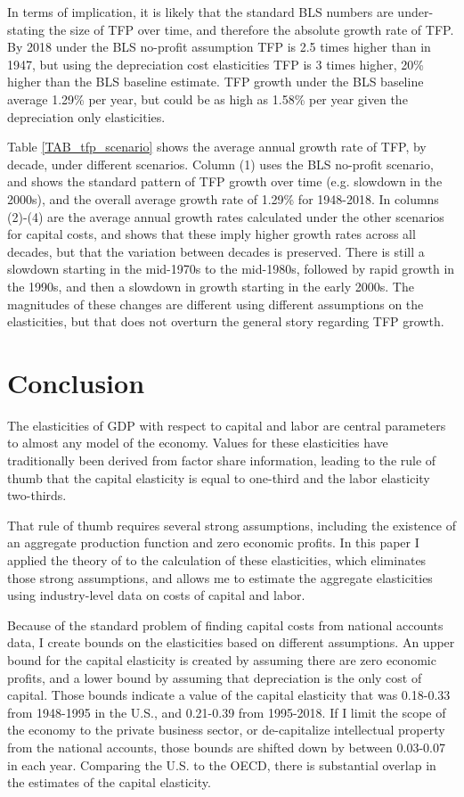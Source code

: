 \documentclass[11pt]{article}
\begin{document}
In terms of implication, it is likely that the standard BLS numbers are under-stating the size of TFP over time, and therefore the absolute growth rate of TFP. By 2018 under the BLS no-profit assumption TFP is 2.5 times higher than in 1947, but using the depreciation cost elasticities TFP is 3 times higher, 20\% higher than the BLS baseline estimate. TFP growth under the BLS baseline average 1.29\% per year, but could be as high as 1.58\% per year given the depreciation only elasticities.

Table \ref{TAB_tfp_scenario} shows the average annual growth rate of TFP, by decade, under different scenarios. Column (1) uses the BLS no-profit scenario, and shows the standard pattern of TFP growth over time (e.g. slowdown in the 2000s), and the overall average growth rate of 1.29\% for 1948-2018. In columns (2)-(4) are the average annual growth rates calculated under the other scenarios for capital costs, and shows that these imply higher growth rates across all decades, but that the variation between decades is preserved. There is still a slowdown starting in the mid-1970s to the mid-1980s, followed by rapid growth in the 1990s, and then a slowdown in growth starting in the early 2000s. The magnitudes of these changes are different using different assumptions on the elasticities, but that does not overturn the general story regarding TFP growth.

\section{Conclusion}
The elasticities of GDP with respect to capital and labor are central parameters to almost any model of the economy. Values for these elasticities have traditionally been derived from factor share information, leading to the rule of thumb that the capital elasticity is equal to one-third and the labor elasticity two-thirds. 

That rule of thumb requires several strong assumptions, including the existence of an aggregate production function and zero economic profits. In this paper I applied the theory of \cite{bfshortnote,bfprodge} to the calculation of these elasticities, which eliminates those strong assumptions, and allows me to estimate the aggregate elasticities using industry-level data on costs of capital and labor. 

Because of the standard problem of finding capital costs from national accounts data, I create bounds on the elasticities based on different assumptions. An upper bound for the capital elasticity is created by assuming there are zero economic profits, and a lower bound by assuming that depreciation is the only cost of capital. Those bounds indicate a value of the capital elasticity that was 0.18-0.33 from 1948-1995 in the U.S., and 0.21-0.39 from 1995-2018. If I limit the scope of the economy to the private business sector, or de-capitalize intellectual property from the national accounts, those bounds are shifted down by between 0.03-0.07 in each year. Comparing the U.S. to the OECD, there is substantial overlap in the estimates of the capital elasticity.
\end{document}

